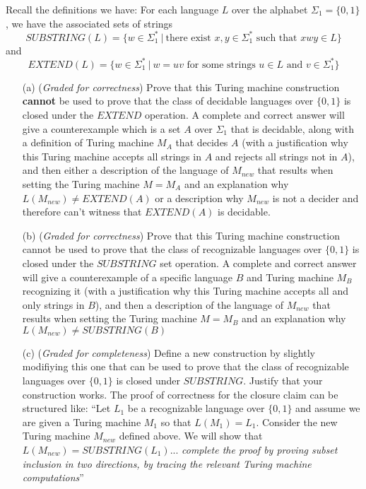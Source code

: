 \documentclass[12pt, oneside]{article}
\newcommand{\gradeCorrect}{({\it Graded for correctness}) }
\newcommand{\gradeComplete}{({\it Graded for completeness}) }
\begin{document}
\begin{enumerate}[wide, labelwidth=!, labelindent=0pt]
Recall the definitions we have:   For each language $L$ over the alphabet $\Sigma_1 = \{0,1\}$, we have the 
associated sets of strings
  $$SUBSTRING(L) = \{ w \in \Sigma_1^* ~|~ \text{there exist } x,y \in \Sigma_1^* \text{ such that } xwy \in L\}$$
and 
  $$EXTEND(L) = \{ w \in \Sigma_1^* ~|~ w = uv \text{ for some strings } u \in L \text{ and } v \in \Sigma_1^* \}$$

\begin{enumerate}
\item[(a)]\gradeCorrect Prove that this Turing machine construction 
{\bf cannot} be used to prove that the
class of decidable languages over $\{0,1\}$ is closed under the 
$EXTEND$ operation.
A complete and correct answer will give a counterexample which is a set $A$ over $\Sigma_1$ that  is decidable, along with a definition of Turing machine $M_A$ 
that decides $A$ 
(with a justification why this Turing machine accepts all 
strings in $A$ and rejects all strings not in $A$), and then either a description of the language of $M_{new}$ that results when setting the Turing machine $M = M_A$ and an explanation why $L(M_{new}) \neq EXTEND(A)$ or 
a description why $M_{new}$ is not a decider and therefore can't witness that $EXTEND(A)$ is decidable.

\item[(b)] \gradeCorrect Prove that this Turing machine construction cannot be used to prove that the
class of recognizable languages over $\{0,1\}$ is closed under the $SUBSTRING$ set operation. A complete and correct answer will 
give a counterexample of a specific language $B$ and Turing machine $M_B$ 
recognizing it
(with a justification why this Turing machine accepts all and only strings in $B$), and then a description of the language of $M_{new}$ that results when 
setting the Turing machine $M = M_B$ and an explanation why $L(M_{new}) \neq SUBSTRING(B)$

\item[(c)] \gradeComplete Define a new construction by slightly modifiying this one that can be used to prove  that the
class of recognizable languages over $\{0,1\}$ is closed under $SUBSTRING$. Justify that 
your construction works. The proof of correctness for the closure claim can be structured like: 
``Let $L_1 $ be a recognizable language over $\{0,1\}$ and 
assume we are given a Turing machine $M_1$ so that $L(M_1) = L_1$. Consider the new Turing machine 
$M_{new}$ defined above. We will show that $L(M_{new}) = SUBSTRING(L_1) $... {\it complete the proof
by proving subset inclusion in two directions, by tracing the relevant Turing machine computations}''


\end{enumerate}
\end{enumerate}
\end{document}
